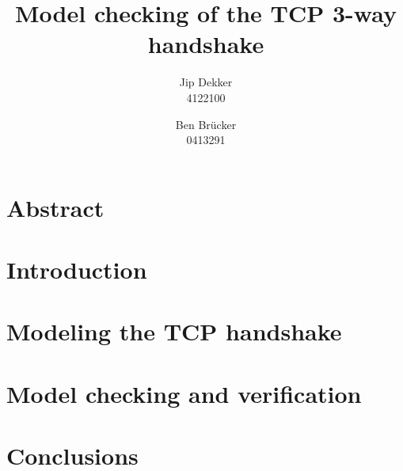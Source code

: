 \documentclass[11pt,a4paper]{article}
\author{Jip Dekker\\4122100 \and Ben Br\"ucker\\0413291}
\title{Model checking of the TCP 3-way handshake}
\begin{document}
\maketitle

\section*{Abstract}

\section*{Introduction}

\section{Modeling the TCP handshake}

\section{Model checking and verification}

\section*{Conclusions}
\end{document}
